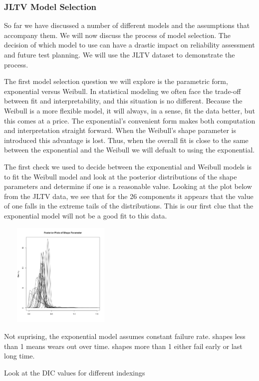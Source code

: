 \documentclass[12pt]{article}
\begin{document}
\subsubsection{JLTV Model Selection}
So far we have discussed a number of different models and the assumptions that
accompany them.  We will now discuss the process of model selection.  The
decision of which model to use can have a drastic impact on reliability
assessment and future test planning.  We will use the JLTV dataset to
demonstrate the process.

The first model selection question we will explore is the parametric form,
exponential versus Weibull.  In statistical modeling we often face the
trade-off between fit and interpretability, and this situation is no different.
Because the Weibull is a more flexible model, it will always, in a sense, fit the
data better, but this comes at a price.  The exponential's convenient form
makes both computation and interpretation straight forward.  When the Weibull's
shape parameter is introduced this advantage is lost.  Thus, when the overall
fit is close to the same between the exponential and the Weibull we will
defualt to using the exponential.

The first check we used to decide between the exponential and Weibull models is
to fit the Weibull model and look at the posterior distributions of the
shape parameters and determine if one is a reasonable value.  Looking at the
plot below from the JLTV data, we see that for the 26 components it appears
that the value of one falls in the extreme tails of the distributions.  This is
our first clue that the exponential model will not be a good fit to this data.

\includegraphics[width=6cm, height=5cm]{betaPostPlot}

Not suprising, the exponential model assumes constant failure rate.  shapes less
than 1 means wears out over time.  shapes more than 1 either fail early or last
long time.

Look at the DIC values for different indexings
\end{document}
